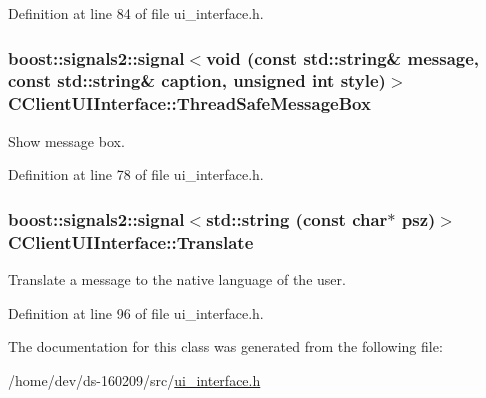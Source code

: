Definition at line 84 of file ui\+\_\+interface.\+h.

\hypertarget{class_c_client_u_i_interface_ab3f23c730300df11cf9ff369fbae0635}{}
\subsubsection[{Thread\+Safe\+Message\+Box}]{\setlength{\rightskip}{0pt plus 5cm}boost\+::signals2\+::signal$<$void (const std\+::string\& message, const std\+::string\& caption, unsigned int style)$>$ C\+Client\+U\+I\+Interface\+::\+Thread\+Safe\+Message\+Box}\label{class_c_client_u_i_interface_ab3f23c730300df11cf9ff369fbae0635}
Show message box. 

Definition at line 78 of file ui\+\_\+interface.\+h.

\hypertarget{class_c_client_u_i_interface_a996160f65965769cf7fc50e6fd17dc9a}{}
\subsubsection[{Translate}]{\setlength{\rightskip}{0pt plus 5cm}boost\+::signals2\+::signal$<$std\+::string (const char$\ast$ psz)$>$ C\+Client\+U\+I\+Interface\+::\+Translate}\label{class_c_client_u_i_interface_a996160f65965769cf7fc50e6fd17dc9a}
Translate a message to the native language of the user. 

Definition at line 96 of file ui\+\_\+interface.\+h.



The documentation for this class was generated from the following file\+:\begin{DoxyCompactItemize}
\item 
/home/dev/ds-\/160209/src/\hyperlink{ui__interface_8h}{ui\+\_\+interface.\+h}\end{DoxyCompactItemize}

